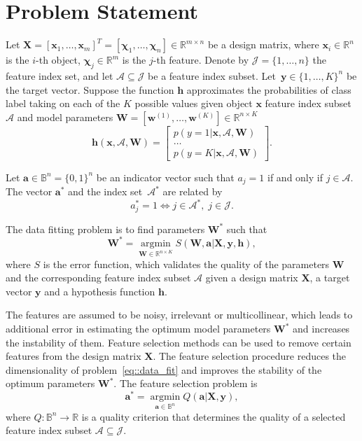 \documentclass[a4paper,12pt]{article}
\theoremstyle{plain} %
\theoremstyle{definition} %
\theoremstyle{remark} %
\newcommand{\bw}{\mathbf{w}}
\newcommand{\bW}{\mathbf{W}}
\newcommand{\bx}{\mathbf{x}}
\newcommand{\bX}{\mathbf{X}}
\newcommand{\by}{\mathbf{y}}
\newcommand{\ba}{\mathbf{a}}
\newcommand{\cA}{\mathcal{A}}
\newcommand{\bchi}{\boldsymbol{\chi}}
\newcommand{\argmin}{\mathop{\arg \min}\limits}
\begin{document}
		
	\section*{Problem Statement}
	
	Let $\bX = [\bx_1, \dots, \bx_m]^T = [\bchi_1, \ldots, \bchi_n] \in \mathbb{R}^{m \times n}$ be a design matrix, where $\bx_i \in \mathbb{R}^n$ is the $i$-th object, $\bchi_j \in \mathbb{R}^m$ is the $j$-th feature.
	Denote by $\mathcal{J} = \{1, \ldots, n \}$ the feature index set, and let $\cA \subseteq \mathcal{J}$ be a feature index subset.
	Let~$\by \in \{1, \dots, K\}^n$ be the target vector.
	Suppose the function $\mathbf{h}$ approximates the probabilities of class label taking on each of the $K$ possible values given object $\bx$ feature index subset $\cA$ and model parameters $\bW = \left[\bw^{(1)}, \dots, \bw^{(K)}\right] \in \mathbb{R}^{n \times K}$
	\[
	\mathbf{h}(\bx, \cA, \bW) = 
	\begin{bmatrix}
	p(y=1 | \bx, \cA, \bW) \\
	\dots \\
	p(y=K | \bx, \cA, \bW) 
	\end{bmatrix}.
	\]	
	
	Let $\mathbf{a} \in \mathbb{B}^n = \{0,1\}^n$ be an indicator vector such that $a_j = 1$ if and only if $j \in \cA$.
	The vector $\mathbf{a}^*$ and the index set~$\cA^*$ are related by
	\begin{equation}
	a^*_j = 1 \Leftrightarrow j \in \mathcal{A}^*, \; j \in \mathcal{J}.
	\label{eq::vec2set}
	\end{equation}
	
	The data fitting problem is to find parameters $\bW^*$ such that
	\begin{equation}
		\bW^* = \argmin_{\bW \in \mathbb{R}^{n \times K}} S\left(\bW, \ba | \bX, \by, \mathbf{h}\right),
		\label{eq::data_fit}
	\end{equation}
	where $S$ is the error function, which validates the quality of the parameters $\bW$ and the corresponding feature index subset $\cA$ given a design matrix $\bX$, a target vector $\by$ and a hypothesis function $\mathbf{h}$.
	
	The features are assumed to be noisy, irrelevant or multicollinear, which leads to  additional error in estimating the optimum model parameters $\bW^*$ and increases the instability of them.
	Feature selection methods can be used to remove certain features from the design matrix $\bX$.
	The feature selection procedure reduces the dimensionality of problem~\eqref{eq::data_fit} and improves the stability of the optimum parameters $\bW^*$.
	The feature selection problem is
	\begin{equation}
	\ba^* = \argmin_{\ba \in \mathbb{B}^n} Q(\ba|\bX, \by),
	\label{eq::feat_sel}
	\end{equation}
	where $Q: \mathbb{B}^n \rightarrow \mathbb{R}$ is a quality criterion that determines the quality of a selected feature index subset $\cA \subseteq \mathcal{J}$. 
	
\end{document}
